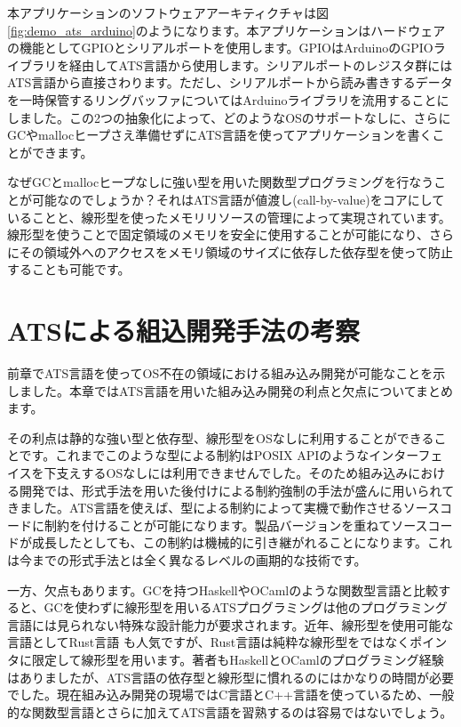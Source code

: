 \documentclass{ipsjprosym}
\begin{document}
本アプリケーションのソフトウェアアーキティクチャは図\ref{fig:demo_ats_arduino}のようになります。本アプリケーションはハードウェアの機能としてGPIOとシリアルポートを使用します。GPIOはArduinoのGPIOライブラリを経由してATS言語から使用します。シリアルポートのレジスタ群にはATS言語から直接さわります。ただし、シリアルポートから読み書きするデータを一時保管するリングバッファについてはArduinoライブラリを流用することにしました。この2つの抽象化によって、どのようなOSのサポートなしに、さらにGCやmallocヒープさえ準備せずにATS言語を使ってアプリケーションを書くことができます。

なぜGCとmallocヒープなしに強い型を用いた関数型プログラミングを行なうことが可能なのでしょうか？それはATS言語が値渡し(call-by-value)をコアにしていることと、線形型を使ったメモリリソースの管理によって実現されています。線形型を使うことで固定領域のメモリを安全に使用することが可能になり、さらにその領域外へのアクセスをメモリ領域のサイズに依存した依存型を使って防止することも可能です。

\section{ATSによる組込開発手法の考察}

前章でATS言語を使ってOS不在の領域における組み込み開発が可能なことを示しました。本章ではATS言語を用いた組み込み開発の利点と欠点についてまとめます。

その利点は静的な強い型と依存型、線形型をOSなしに利用することができることです。これまでこのような型による制約はPOSIX APIのようなインターフェイスを下支えするOSなしには利用できませんでした。そのため組み込みにおける開発では、形式手法を用いた後付けによる制約強制の手法が盛んに用いられてきました。ATS言語を使えば、型による制約によって実機で動作させるソースコードに制約を付けることが可能になります。製品バージョンを重ねてソースコードが成長したとしても、この制約は機械的に引き継がれることになります。これは今までの形式手法とは全く異なるレベルの画期的な技術です。

一方、欠点もあります。GCを持つHaskellやOCamlのような関数型言語と比較すると、GCを使わずに線形型を用いるATSプログラミングは他のプログラミング言語には見られない特殊な設計能力が要求されます。近年、線形型を使用可能な言語としてRust言語 \cite{rust} も人気ですが、Rust言語は純粋な線形型をではなくポインタに限定して線形型を用います。著者もHaskellとOCamlのプログラミング経験はありましたが、ATS言語の依存型と線形型に慣れるのにはかなりの時間が必要でした。現在組み込み開発の現場ではC言語とC++言語を使っているため、一般的な関数型言語とさらに加えてATS言語を習熟するのは容易ではないでしょう。
\end{document}
